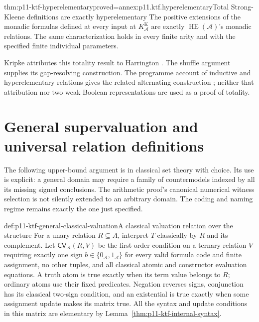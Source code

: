 \begin{hbtheorem}{thm:p11-ktf-hyperelementary}{proved=annex:p11.ktf.hyperelementary}{Total Strong-Kleene definitions are exactly hyperelementary}
The positive extensions of the monadic formulas defined at every
input at \(K_{\mathcal A}^{\mathrm K}\) are exactly
\(\operatorname{HE}(\mathcal A)\)'s monadic relations.
The same characterization holds in every finite arity and with the
specified finite individual parameters.
\end{hbtheorem}

Kripke attributes this totality result to Harrington
\cite[p.~716]{Kripke1975}. The shuffle argument supplies its
gap-resolving construction. The programme account of inductive and
hyperelementary relations gives the related alternating construction
\cite[Section~5]{HarelKozen1984IND}; neither that attribution nor
two weak Boolean representations are used as a proof of totality.

\section{General supervaluation and universal relation definitions}

The following upper-bound argument is in classical set theory with
choice. Its use is explicit: a general domain may require a family
of countermodels indexed by all its missing signed conclusions.
The arithmetic proof's canonical numerical witness selection is not
silently extended to an arbitrary domain. The coding and naming
regime remains exactly the one just specified.

\begin{hbdefinition}{def:p11-ktf-general-classical-valuation}{A classical valuation relation over the structure}
For a unary relation \(R\subseteq A\), interpret \(T\)
classically by \(R\) and its complement. Let
\(\mathsf{CV}_{\mathcal A}(R,V)\) be the first-order condition
on a ternary relation \(V\) requiring exactly one sign
\(b\in\{0_{\mathcal A},1_{\mathcal A}\}\) for every
valid formula code and finite assignment, no other tuples, and all
classical atomic and constructor evaluation equations. A truth atom
is true exactly when its term value belongs to \(R\); ordinary
atoms use their fixed predicates. Negation reverses signs, conjunction
has its classical two-sign condition, and an existential is true
exactly when some assignment update makes its matrix true.
All the syntax and update conditions in this matrix are elementary
by Lemma~\ref{thm:p11-ktf-internal-syntax}.
\end{hbdefinition}

